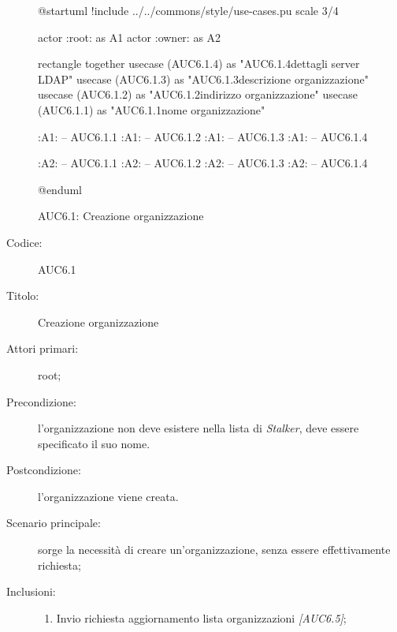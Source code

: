 \documentclass[casi-duso]{subfiles}
\begin{document}
  \begin{figure}[h!] 
    \centering 
    \begin{plantuml}
    @startuml
    !include ../../commons/style/use-cases.pu
    scale 3/4

    actor :root: as A1
    actor :owner: as A2


    rectangle {
      together {
        usecase (AUC6.1.4) as "AUC6.1.4\nConfigurazione dettagli server LDAP"
        usecase (AUC6.1.3) as "AUC6.1.3\nInserisci descrizione organizzazione"
        usecase (AUC6.1.2) as "AUC6.1.2\nInserisci indirizzo organizzazione"
        usecase (AUC6.1.1) as "AUC6.1.1\nInserisci nome organizzazione"
      }
    }

    :A1: -- AUC6.1.1
    :A1: -- AUC6.1.2
    :A1: -- AUC6.1.3
    :A1: -- AUC6.1.4

    :A2: -- AUC6.1.1
    :A2: -- AUC6.1.2
    :A2: -- AUC6.1.3
    :A2: -- AUC6.1.4

    @enduml
    \end{plantuml} 
    \caption{AUC6.1: Creazione organizzazione} 
    \label{fig:auc6_1} 
  \end{figure}

  \begin{description}
    \item[Codice:] AUC6.1
    \item[Titolo:] Creazione organizzazione
    \item[Attori primari:] root;
    \item[Precondizione:] l'organizzazione non deve esistere nella lista di \emph{Stalker}, deve essere specificato il suo nome.
    \item[Postcondizione:] l'organizzazione viene creata.
    \item[Scenario principale:] sorge la necessità di creare un'organizzazione, senza essere effettivamente richiesta;
    \item[Inclusioni:]
    \begin{enumerate}
      \item Invio richiesta aggiornamento lista organizzazioni \emph{[AUC6.5]};
    \end{enumerate}
  \end{description}
\end{document}
